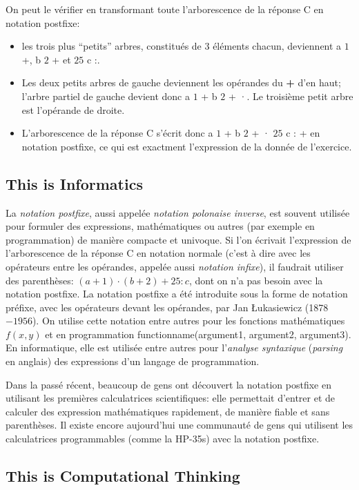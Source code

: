 \documentclass[a4paper,11pt]{report}
\newcommand{\BrochureInlineCode}[1]{{\ttfamily #1}}
\begin{document}
On peut le vérifier en transformant toute l’arborescence de la réponse C en notation postfixe:

\begin{itemize}
  \item les trois plus “petits” arbres, constitués de $3$ éléments chacun, deviennent a $1$ +, b $2$ + et $25$ c :.
  \item Les deux petits arbres de gauche deviennent les opérandes du \textbf{+} d’en haut; l’arbre partiel de gauche devient donc a $1$ + b $2$ + ·. Le troisième petit arbre est l’opérande de droite.
  \item L’arborescence de la réponse C s’écrit donc a $1$ + b $2$ + · $25$ c : + en notation postfixe, ce qui est exactment l’expression de la donnée de l’exercice.
\end{itemize}


\subsection*{This is Informatics}

La \emph{notation postfixe}, aussi appelée \emph{notation polonaise inverse}, est souvent utilisée pour formuler des expressions, mathématiques ou autres (par exemple en programmation) de manière compacte et univoque. Si l’on écrivait l’expression de l’arborescence de la réponse C en notation normale (c’est à dire avec les opérateurs entre les opérandes, appelée aussi \emph{notation infixe}), il faudrait utiliser des parenthèses: ${(a + 1) \cdot (b + 2) + 25 : c}$, dont on n’a pas besoin avec la notation postfixe. La notation postfixe a été introduite sous la forme de notation préfixe, avec les opérateurs devant les opérandes, par Jan Łukasiewicz (1878$-1956$). On utilise cette notation entre autres pour les fonctions mathématiques ${f(x, y)}$ et en programmation \BrochureInlineCode{functionname(argument1, argument2, argument3)}. En informatique, elle est utilisée entre autres pour l’\emph{analyse syntaxique} (\emph{parsing} en anglais) des expressions d’un langage de programmation.

Dans la passé récent, beaucoup de gens ont découvert la notation postfixe en utilisant les premières calculatrices scientifiques: elle permettait d’entrer et de calculer des expression mathématiques rapidement, de manière fiable et sans parenthèses. Il existe encore aujourd’hui une communauté de gens qui utilisent les calculatrices programmables (comme la HP-35s) avec la notation postfixe.


\subsection*{This is Computational Thinking}
\end{document}
